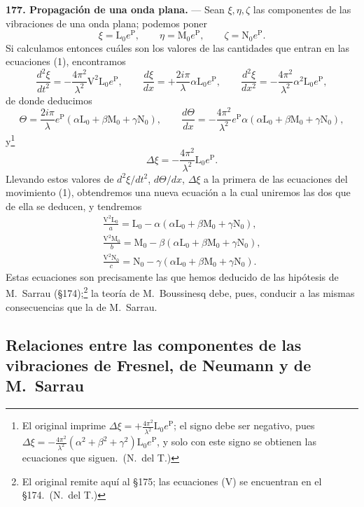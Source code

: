 \noindent\textbf{177. Propagación de una onda plana.} — Sean
$\xi,\eta,\zeta$ las componentes de las vibraciones de una onda plana;
podemos poner
\begin{equation}
\xi=\mathrm L_0e^{\mathrm P},\qquad \eta=\mathrm M_0e^{\mathrm P},\qquad
\zeta=\mathrm N_0e^{\mathrm P}.
\tag{2}
\end{equation}
Si calculamos entonces cuáles son los valores de las cantidades que entran
en las ecuaciones (1), encontramos
\[
\frac{d^2\xi}{dt^2}=-\frac{4\pi^2}{\lambda^2}\mathrm V^2\mathrm L_0e^{\mathrm P},\qquad
\frac{d\xi}{dx}=+\frac{2i\pi}{\lambda}\alpha\mathrm L_0e^{\mathrm P},\qquad
\frac{d^2\xi}{dx^2}=-\frac{4\pi^2}{\lambda^2}\alpha^2\mathrm L_0e^{\mathrm P},
\]
de donde deducimos
\[
\Theta=\frac{2i\pi}{\lambda}e^{\mathrm P}(\alpha\mathrm L_0+\beta\mathrm M_0+\gamma\mathrm N_0),\qquad
\frac{d\Theta}{dx}=-\frac{4\pi^2}{\lambda^2}e^{\mathrm P}\alpha(\alpha\mathrm L_0+\beta\mathrm M_0+\gamma\mathrm N_0),
\]
y\footnote{El original imprime $\Delta\xi=+\frac{4\pi^2}{\lambda^2}\mathrm L_0e^{\mathrm P}$; el signo debe ser negativo, pues
$\Delta\xi=-\frac{4\pi^2}{\lambda^2}(\alpha^2+\beta^2+\gamma^2)\mathrm L_0e^{\mathrm P}$,
y solo con este signo se obtienen las ecuaciones que siguen.~(N.~del T.)}
\[
\Delta\xi=-\frac{4\pi^2}{\lambda^2}\mathrm L_0e^{\mathrm P}.
\]
Llevando estos valores de $d^2\xi/dt^2$, $d\Theta/dx$, $\Delta\xi$ a la
primera de las ecuaciones del movimiento (1), obtendremos una nueva
ecuación a la cual uniremos las dos que de ella se deducen, y tendremos
\begin{gather*}
\frac{\mathrm V^2\mathrm L_0}{a}=\mathrm L_0-\alpha(\alpha\mathrm L_0+\beta\mathrm M_0+\gamma\mathrm N_0),\\
\frac{\mathrm V^2\mathrm M_0}{b}=\mathrm M_0-\beta(\alpha\mathrm L_0+\beta\mathrm M_0+\gamma\mathrm N_0),\\
\frac{\mathrm V^2\mathrm N_0}{c}=\mathrm N_0-\gamma(\alpha\mathrm L_0+\beta\mathrm M_0+\gamma\mathrm N_0).
\end{gather*}
Estas ecuaciones son precisamente las que hemos deducido de las hipótesis
de M.~Sarrau (§174);\footnote{El original remite aquí al §175; las ecuaciones (V) se encuentran en el §174.~(N.~del T.)} la teoría de M.~Boussinesq debe, pues, conducir a las
mismas consecuencias que la de M.~Sarrau.

\subsection{Relaciones entre las componentes de las vibraciones de
Fresnel, de Neumann y de M.~Sarrau}

